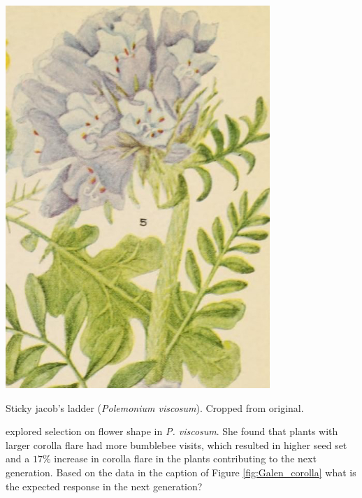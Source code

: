\begin{marginfigure}
\begin{center}
\includegraphics[width=0.75\textwidth]{illustration_images/Quant_gen/Polemonium_viscosum_Galen/Polemonium_viscosum.jpg}
\end{center}
\caption{Sticky jacob's ladder ({\it Polemonium viscosum}). 
Cropped from original.}
\end{marginfigure}


\begin{question}
\citet{galen:96} explored selection on flower shape in
{\it P. viscosum}.  She found that plants with larger corolla flare
had more bumblebee visits, which resulted in higher seed set and a
$17\%$ increase in corolla flare in the plants contributing to the
next generation. Based on the data in the caption of Figure \ref{fig:Galen_corolla}
what is the expected response in the next generation?
\end{question}

